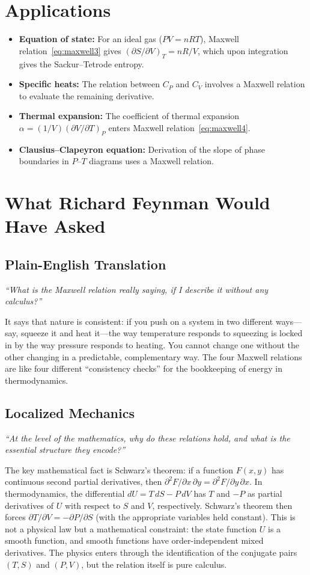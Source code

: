 \documentclass[11pt,openright]{book}
\begin{document}
\section*{Applications}

\begin{itemize}
  \item \textbf{Equation of state:} For an ideal gas ($PV = nRT$), Maxwell relation~\eqref{eq:maxwell3} gives $(\partial S/\partial V)_{T} = nR/V$, which upon integration gives the Sackur--Tetrode entropy.
  \item \textbf{Specific heats:} The relation between $C_{P}$ and $C_{V}$ involves a Maxwell relation to evaluate the remaining derivative.
  \item \textbf{Thermal expansion:} The coefficient of thermal expansion $\alpha = (1/V)(\partial V/\partial T)_{P}$ enters Maxwell relation~\eqref{eq:maxwell4}.
  \item \textbf{Clausius--Clapeyron equation:} Derivation of the slope of phase boundaries in $P$--$T$ diagrams uses a Maxwell relation.
\end{itemize}
\section*{What Richard Feynman Would Have Asked}

\subsection*{Plain-English Translation}
\textit{``What is the Maxwell relation really saying, if I describe it without any calculus?''}

It says that nature is consistent: if you push on a system in two different ways---say, squeeze it and heat it---the way temperature responds to squeezing is locked in by the way pressure responds to heating. You cannot change one without the other changing in a predictable, complementary way. The four Maxwell relations are like four different ``consistency checks'' for the bookkeeping of energy in thermodynamics.

\subsection*{Localized Mechanics}
\textit{``At the level of the mathematics, why do these relations hold, and what is the essential structure they encode?''}

The key mathematical fact is Schwarz's theorem: if a function $F(x,y)$ has continuous second partial derivatives, then $\partial^{2}F/\partial x\,\partial y = \partial^{2}F/\partial y\,\partial x$. In thermodynamics, the differential $dU = T\,dS - P\,dV$ has $T$ and $-P$ as partial derivatives of $U$ with respect to $S$ and $V$, respectively. Schwarz's theorem then forces $\partial T/\partial V = -\partial P/\partial S$ (with the appropriate variables held constant). This is not a physical law but a mathematical constraint: the state function $U$ is a smooth function, and smooth functions have order-independent mixed derivatives. The physics enters through the identification of the conjugate pairs $(T, S)$ and $(P, V)$, but the relation itself is pure calculus.
\end{document}
